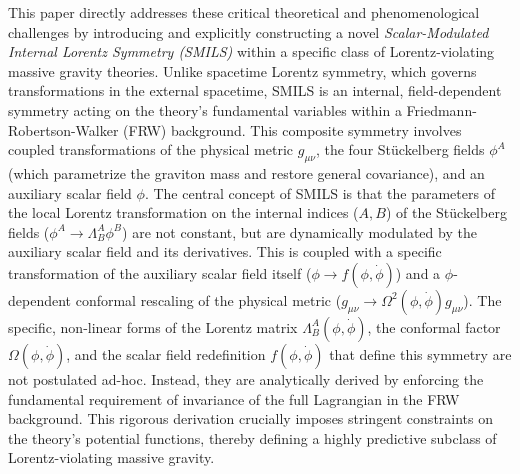 \documentclass[twocolumn]{aastex631}
\begin{document}
This paper directly addresses these critical theoretical and phenomenological challenges by introducing and explicitly constructing a novel \textit{Scalar-Modulated Internal Lorentz Symmetry (SMILS)} within a specific class of Lorentz-violating massive gravity theories. Unlike spacetime Lorentz symmetry, which governs transformations in the external spacetime, SMILS is an internal, field-dependent symmetry acting on the theory's fundamental variables within a Friedmann-Robertson-Walker (FRW) background. This composite symmetry involves coupled transformations of the physical metric $g_{\mu\nu}$, the four Stückelberg fields $\phi^A$ (which parametrize the graviton mass and restore general covariance), and an auxiliary scalar field $\phi$. The central concept of SMILS is that the parameters of the local Lorentz transformation on the internal indices ($A, B$) of the Stückelberg fields ($\phi^A \rightarrow \Lambda^A_B \phi^B$) are not constant, but are dynamically modulated by the auxiliary scalar field and its derivatives. This is coupled with a specific transformation of the auxiliary scalar field itself ($\phi \rightarrow f(\phi, \dot{\phi})$) and a $\phi$-dependent conformal rescaling of the physical metric ($g_{\mu\nu} \rightarrow \Omega^2(\phi, \dot{\phi}) g_{\mu\nu}$). The specific, non-linear forms of the Lorentz matrix $\Lambda^A_B(\phi, \dot{\phi})$, the conformal factor $\Omega(\phi, \dot{\phi})$, and the scalar field redefinition $f(\phi, \dot{\phi})$ that define this symmetry are not postulated ad-hoc. Instead, they are analytically derived by enforcing the fundamental requirement of invariance of the full Lagrangian in the FRW background. This rigorous derivation crucially imposes stringent constraints on the theory's potential functions, thereby defining a highly predictive subclass of Lorentz-violating massive gravity.
\end{document}
